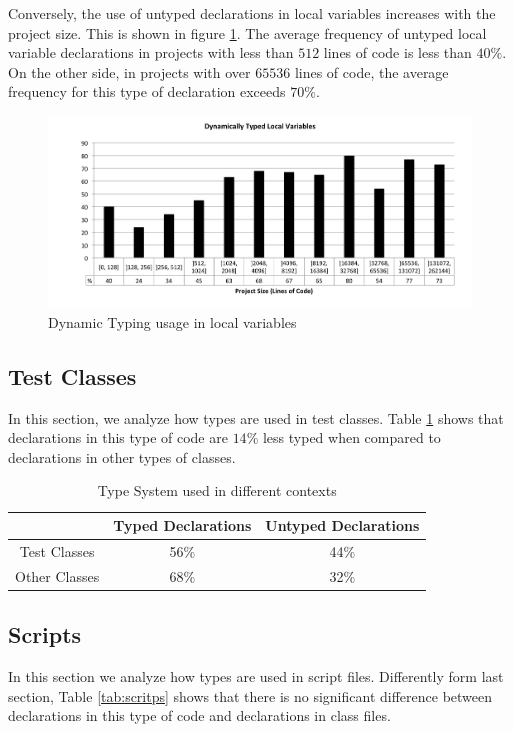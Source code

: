 \documentclass[preprint]{sigplanconf}
\begin{document}
Conversely, the use of untyped declarations in local variables increases with the project size. 
This is shown in figure \ref{fig:size_localVariable}. 
The average frequency of untyped local variable declarations in projects with less than $512$ lines of code is less than $40\%$. 
On the other side, in projects with over $65536$ lines of code, the average frequency for this type of declaration exceeds $70\%$.

\begin{figure}[ht]
\centering 
\includegraphics[width=1\textwidth]{images/size_localVariable} 
\caption{Dynamic Typing usage in local variables}
\label{fig:size_localVariable} 
\end{figure}



\subsection{Test Classes\label{sub:scripts}}
In this section, we analyze how types are used in test classes.
Table \ref{tab:tests} shows that declarations in this type of code are $14\%$ less typed when compared to declarations in other types of classes.

\begin{table}[ht]
\caption{Type System used in different contexts}
\centering{}%
\begin{tabular}{|c|c|c|}
\hline 
 & Typed Declarations & Untyped Declarations\tabularnewline
\hline  
\hline 
Test Classes & 56\% & 44\%\tabularnewline
\hline 
Other Classes & 68\% & 32\%\tabularnewline
\hline 
\end{tabular}
\label{tab:tests}
\end{table}

\subsection{Scripts\label{sub:scripts}}
In this section we analyze how types are used in script files.
Differently form last section, Table \ref{tab:scritps} shows that there is no significant difference between declarations in this type of code and declarations in class files.
\end{document}
